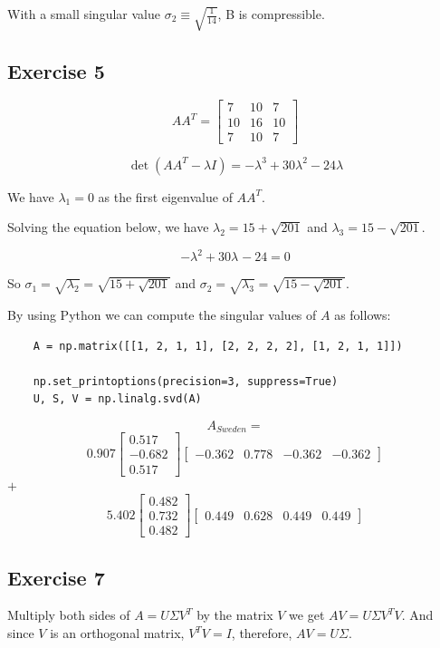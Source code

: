 \documentclass{article}
\begin{document}
With a small singular value $\sigma_{2} \equiv \sqrt{\frac{1}{14}}$, B is compressible.

\subsection{Exercise 5}
\[
    AA^{T}=
    \begin{bmatrix}
        7  & 10 & 7  \\
        10 & 16 & 10 \\
        7  & 10 & 7
    \end{bmatrix}
\]

\[
    \det(AA^{T} - \lambda I) = -\lambda^{3} + 30 \lambda^{2} - 24\lambda
\]

We have $\lambda_{1} = 0$ as the first eigenvalue of $AA^{T}$.

Solving the equation below, we have $\lambda_{2} = 15 + \sqrt{201}$ and $\lambda_{3} = 15 - \sqrt{201}$.

\[
    -\lambda^{2} + 30 \lambda^{} - 24 = 0
\]

So $\sigma_{1} = \sqrt{\lambda_{2}} = \sqrt{15 + \sqrt{201}}$ and $\sigma_{2} = \sqrt{\lambda_{3}} = \sqrt{15 - \sqrt{201}}$.

By using Python we can compute the singular values of $A$ as follows:
\begin{verbatim}
    A = np.matrix([[1, 2, 1, 1], [2, 2, 2, 2], [1, 2, 1, 1]])

    np.set_printoptions(precision=3, suppress=True)
    U, S, V = np.linalg.svd(A)
\end{verbatim}

\[
    A_{Sweden} =
\]
\[
    0.907
    \begin{bmatrix}
        0.517  \\
        -0.682 \\
        0.517
    \end{bmatrix}
    \begin{bmatrix}
        -0.362 & 0.778 & -0.362 & -0.362
    \end{bmatrix}
\]
$+$
\[
    5.402
    \begin{bmatrix}
        0.482 \\
        0.732 \\
        0.482
    \end{bmatrix}
    \begin{bmatrix}
        0.449 & 0.628 & 0.449 & 0.449
    \end{bmatrix}
\]

\subsection{Exercise 7}
Multiply both sides of $A = U \Sigma V^{T}$ by the matrix $V$ we get $AV = U \Sigma V^{T}V$. And since $V$ is an orthogonal matrix, $V^{T}V = I$, therefore, $AV = U \Sigma$.
\end{document}

